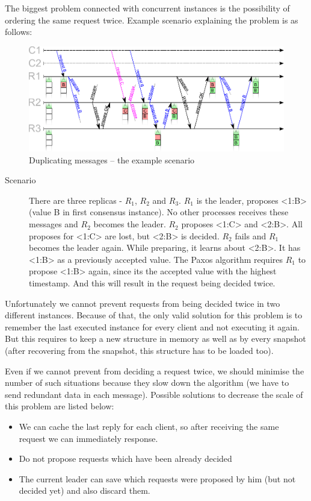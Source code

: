 The biggest problem connected with concurrent instances is the possibility of ordering the same request twice. Example scenario explaining the problem is as follows:
\begin{figure}[ht]
  \includegraphics[keepaspectratio, width=\textwidth]{paxos/duplicating_messages.pdf}
  \caption{Duplicating messages -- the example scenario}
\end{figure}
\begin{description}
  \item[Scenario] There are three replicas - $R_1$, $R_2$ and $R_3$. $R_1$ is the leader, proposes <1:B> (value B in first consensus instance). No other processes receives these messages and $R_2$ becomes the leader. $R_2$ proposes <1:C> and <2:B>. All proposes for <1:C> are lost, but <2:B> is decided. $R_2$ fails and $R_1$ becomes the leader again. While preparing, it learns about <2:B>. It has <1:B> as a previously accepted value. The Paxos algorithm requires $R_1$ to propose <1:B> again, since its the accepted value with the highest timestamp. And this will result in the request being decided twice.
\end{description}

Unfortunately we cannot prevent requests from being decided twice in two different instances. Because of that, the only valid solution for this problem is to remember the last executed instance for every client and not executing it again. But this requires to keep a new structure in memory as well as by every snapshot (after recovering from the snapshot, this structure has to be loaded too).

Even if we cannot prevent from deciding a request twice, we should minimise the number of such situations because they slow down the algorithm (we have to send redundant data in each message). Possible solutions to decrease the scale of this problem are listed below:
\begin{itemize}
  \item We can cache the last reply for each client, so after receiving the same request we can immediately response.
  \item Do not propose requests which have been already decided
  \item The current leader can save which requests were proposed by him (but not decided yet) and also discard them.
\end{itemize}

